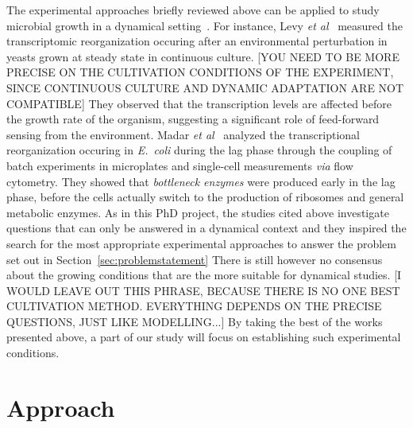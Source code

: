 The experimental approaches briefly reviewed above can be applied to study microbial growth in a dynamical setting~\cite{levy_strategy_2007,levy_coordination_2009,madar_promoter_2013,ehrenberg_mediumdependent_2012}.
For instance, Levy \textit{et al}~\cite{levy_strategy_2007,levy_coordination_2009} measured the transcriptomic reorganization occuring after an environmental perturbation in yeasts grown at steady state in continuous culture. [YOU NEED TO BE MORE PRECISE ON THE CULTIVATION CONDITIONS OF THE EXPERIMENT, SINCE CONTINUOUS CULTURE AND DYNAMIC ADAPTATION ARE NOT COMPATIBLE]
They observed that the transcription levels are affected before the growth rate of the organism, suggesting a significant role of feed-forward sensing from the environment.
Madar \textit{et al}~\cite{madar_promoter_2013} analyzed the transcriptional reorganization occuring in \textit{E.~coli} during the lag phase through the coupling of batch experiments in microplates and single-cell measurements \textit{via} flow cytometry.
They showed that \textit{bottleneck enzymes} were produced early in the lag phase, before the cells actually switch to the production of ribosomes and general metabolic enzymes.
As in this PhD project, the studies cited above investigate questions that can only be answered in a dynamical context and they inspired the search for the most appropriate experimental approaches to answer the problem set out in Section~\ref{sec:problemstatement}
There is still however no consensus about the growing conditions that are the more suitable for dynamical studies. [I WOULD LEAVE OUT THIS PHRASE, BECAUSE THERE IS NO ONE BEST CULTIVATION METHOD. EVERYTHING DEPENDS ON THE PRECISE QUESTIONS, JUST LIKE MODELLING...]
By taking the best of the works presented above, a part of our study will focus on establishing such experimental conditions.

\section{Approach}
\label{sec:approach}

